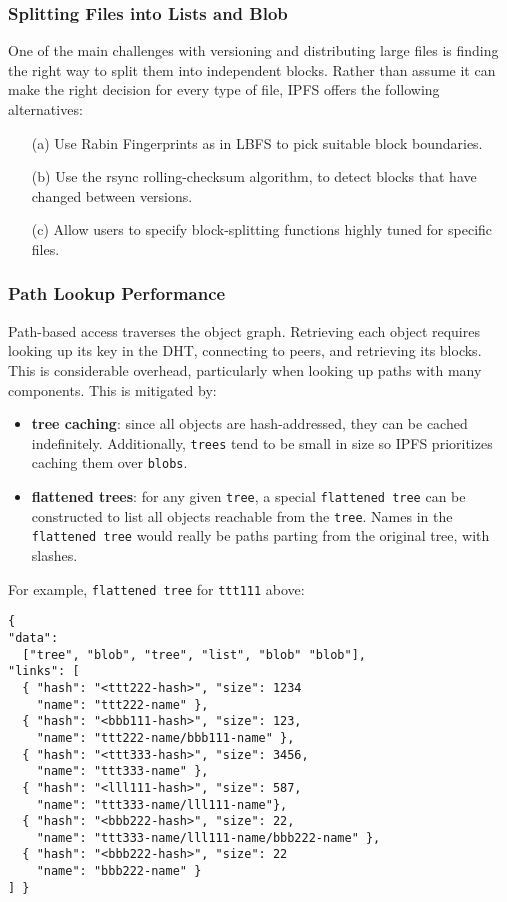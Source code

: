 \documentclass{sig-alternate}
\begin{document}
\subsubsection{Splitting Files into Lists and Blob}

One of the main challenges with versioning and distributing large files is finding the right way to split them into independent blocks. Rather than assume it can make the right decision for every type of file, IPFS offers the following alternatives:

\begin{enumerate}
  \item[(a)] Use Rabin Fingerprints \cite{RabinFingerprints} as in LBFS \cite{LBFS} to pick suitable block boundaries.
  \item[(b)] Use the rsync \cite{rsync} rolling-checksum algorithm, to detect blocks that have changed between versions.
  \item[(c)] Allow users to specify block-splitting functions highly tuned for specific files.
\end{enumerate}

\subsubsection{Path Lookup Performance}

Path-based access traverses the object graph. Retrieving
each object requires looking up its key in the DHT,
connecting to peers, and retrieving its blocks. This is considerable
overhead, particularly when looking up paths with many components.
This is mitigated by:

\begin{itemize}
  \item \textbf{tree caching}: since all objects are hash-addressed, they
        can be cached indefinitely. Additionally, \texttt{trees} tend to be
        small in size so IPFS prioritizes caching them over \texttt{blobs}.
  \item \textbf{flattened trees}: for any given \texttt{tree}, a special
        \texttt{flattened tree} can be constructed to list all objects
        reachable from the \texttt{tree}. Names in the \texttt{flattened tree}
        would really be paths parting from the original tree, with slashes.
\end{itemize}

For example, \texttt{flattened tree} for \texttt{ttt111} above:

\begin{verbatim}
{
"data":
  ["tree", "blob", "tree", "list", "blob" "blob"],
"links": [
  { "hash": "<ttt222-hash>", "size": 1234
    "name": "ttt222-name" },
  { "hash": "<bbb111-hash>", "size": 123,
    "name": "ttt222-name/bbb111-name" },
  { "hash": "<ttt333-hash>", "size": 3456,
    "name": "ttt333-name" },
  { "hash": "<lll111-hash>", "size": 587,
    "name": "ttt333-name/lll111-name"},
  { "hash": "<bbb222-hash>", "size": 22,
    "name": "ttt333-name/lll111-name/bbb222-name" },
  { "hash": "<bbb222-hash>", "size": 22
    "name": "bbb222-name" }
] }
\end{verbatim}
\end{document}
